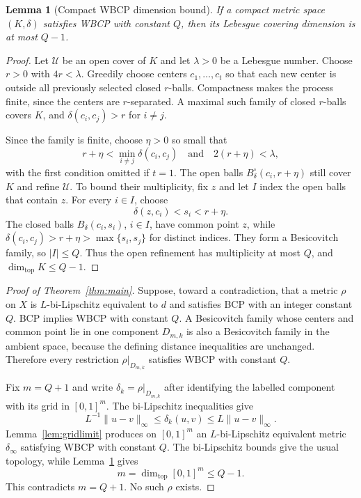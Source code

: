 \documentclass[11pt]{article}
\newtheorem{lemma}[theorem]{Lemma}
\begin{document}
\begin{lemma}[Compact WBCP dimension bound]\label{lem:dimension}
If a compact metric space $(K,\delta)$ satisfies WBCP with constant $Q$, then
its Lebesgue covering dimension is at most $Q-1$.
\end{lemma}

\begin{proof}
Let $\mathcal U$ be an open cover of $K$ and let $\lambda>0$ be a Lebesgue
number.  Choose $r>0$ with $4r<\lambda$.  Greedily choose centers
$c_1,\ldots,c_t$ so that each new center is outside all previously selected
closed $r$-balls.  Compactness makes the process finite, since the centers are
$r$-separated.  A maximal such family of closed $r$-balls covers $K$, and
$\delta(c_i,c_j)>r$ for $i\ne j$.

Since the family is finite, choose $\eta>0$ so small that
\[
 r+\eta<\min_{i\ne j}\delta(c_i,c_j)
 \quad\text{and}\quad 2(r+\eta)<\lambda,
\]
with the first condition omitted if $t=1$.  The open balls
$B_\delta^\circ(c_i,r+\eta)$ still cover $K$ and refine $\mathcal U$.
To bound their multiplicity, fix $z$ and let $I$ index the open balls that
contain $z$.  For every $i\in I$, choose
\[
 \delta(z,c_i)<s_i<r+\eta.
\]
The closed balls $B_\delta(c_i,s_i)$, $i\in I$, have common point $z$, while
$\delta(c_i,c_j)>r+\eta>\max\{s_i,s_j\}$ for distinct indices.  They form a
Besicovitch family, so $|I|\leq Q$.  Thus the open refinement has
multiplicity at most $Q$, and
$\dim_{\mathrm{top}}K\leq Q-1$.
\end{proof}

\begin{proof}[Proof of Theorem~\ref{thm:main}]
Suppose, toward a contradiction, that a metric $\rho$ on $X$ is
$L$-bi-Lipschitz equivalent to $d$ and satisfies BCP with an integer constant
$Q$.  BCP implies WBCP with constant $Q$.  A Besicovitch family whose centers
and common point lie in one component $D_{m,k}$ is also a Besicovitch family
in the ambient space, because the defining distance inequalities are
unchanged.  Therefore every restriction $\rho|_{D_{m,k}}$ satisfies WBCP with
constant $Q$.

Fix $m=Q+1$ and write $\delta_k=\rho|_{D_{m,k}}$ after identifying the
labelled component with its grid in $[0,1]^m$.  The bi-Lipschitz inequalities
give
\[
 L^{-1}\|u-v\|_\infty\leq\delta_k(u,v)
 \leq L\|u-v\|_\infty.
\]
Lemma~\ref{lem:gridlimit} produces on $[0,1]^m$ an $L$-bi-Lipschitz equivalent
metric $\delta_\infty$ satisfying WBCP with constant $Q$.  The bi-Lipschitz
bounds give the usual topology, while Lemma~\ref{lem:dimension} gives
\[
 m=\dim_{\mathrm{top}}[0,1]^m\leq Q-1.
\]
This contradicts $m=Q+1$.  No such $\rho$ exists.
\end{proof}
\end{document}
